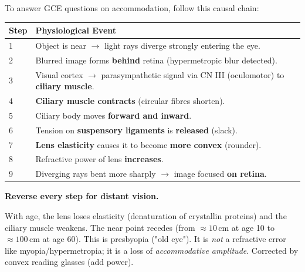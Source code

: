 \documentclass[11pt]{article}
\newcommand{\cle}[1]{{\popxbold\color{popdark}#1}}
\begin{document}
\begin{methode}
To answer GCE questions on accommodation, follow this causal chain:
\begin{center}
\begin{tabularx}{\linewidth}{|l|X|}\hline
\textbf{Step} & \textbf{Physiological Event} \\ \hline
1 & Object is near $\to$ light rays diverge strongly entering the eye. \\ \hline
2 & Blurred image forms \textbf{behind} retina (hypermetropic blur detected). \\ \hline
3 & Visual cortex $\to$ parasympathetic signal via CN III (oculomotor) to \textbf{ciliary muscle}. \\ \hline
4 & \textbf{Ciliary muscle contracts} (circular fibres shorten). \\ \hline
5 & Ciliary body moves \textbf{forward and inward}. \\ \hline
6 & Tension on \textbf{suspensory ligaments} is \textbf{released} (slack). \\ \hline
7 & \textbf{Lens elasticity} causes it to become \textbf{more convex} (rounder). \\ \hline
8 & Refractive power of lens \textbf{increases}. \\ \hline
9 & Diverging rays bent more sharply $\to$ image focused \textbf{on retina}. \\ \hline
\end{tabularx}
\end{center}
\textbf{Reverse every step for distant vision.}
\end{methode}

\begin{attention}
With age, the lens loses elasticity (denaturation of crystallin proteins) and the ciliary muscle weakens. The near point recedes (from $\approx 10\,\mathrm{cm}$ at age 10 to $\approx 100\,\mathrm{cm}$ at age 60). This is \cle{presbyopia} ("old eye"). It is \emph{not} a refractive error like myopia/hypermetropia; it is a loss of \emph{accommodative amplitude}. Corrected by convex reading glasses (add power).
\end{attention}
\end{document}
